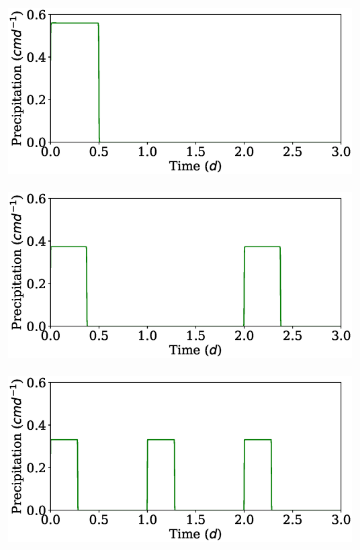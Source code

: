 \documentclass[11pt,a4paper]{article}
\numberwithin{equation}{section}
\begin{document}
\begin{figure}
	\centering
	\begin{subfigure}{0.32\textwidth}
		\includegraphics[width = \linewidth, keepaspectratio] {pr_ppat1ptot0_28.eps}
		\caption{}
	\end{subfigure}
	\begin{subfigure}{0.32\textwidth}
		\includegraphics[width = \linewidth, keepaspectratio] {pr_ppat2ptot0_28.eps}
		\caption{}
	\end{subfigure}
	\begin{subfigure}{0.32\textwidth}
		\includegraphics[width = \linewidth, keepaspectratio] {pr_ppat3ptot0_28.eps}
		\caption{}
	\end{subfigure}\\

\end{figure}
\end{document}
